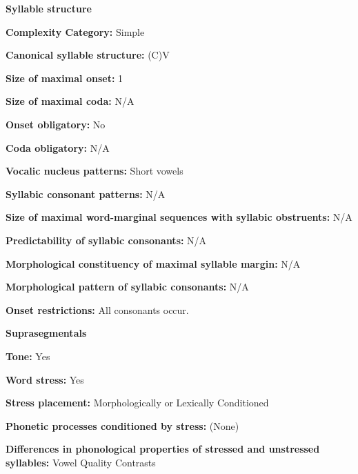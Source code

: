 \textbf{Syllable structure}



\textbf{Complexity Category:} Simple



\textbf{Canonical syllable structure:} (C)V \citep[11-12]{Franklin1971}



\textbf{Size of maximal onset:} 1



\textbf{Size of maximal coda:} N/A



\textbf{Onset obligatory:} No



\textbf{Coda obligatory:} N/A



\textbf{Vocalic nucleus patterns:} Short vowels



\textbf{Syllabic consonant patterns:} N/A



\textbf{Size of maximal word{}-marginal sequences with syllabic obstruents:} N/A



\textbf{Predictability of syllabic consonants:} N/A



\textbf{Morphological constituency of maximal syllable margin:} N/A



\textbf{Morphological pattern of syllabic consonants:} N/A



\textbf{Onset restrictions:} All consonants occur.



\textbf{Suprasegmentals}



\textbf{Tone:} Yes



\textbf{Word stress:} Yes



\textbf{Stress placement:} Morphologically or Lexically Conditioned



\textbf{Phonetic processes conditioned by stress:} (None)



\textbf{Differences in phonological properties of stressed and unstressed syllables:} Vowel Quality Contrasts



